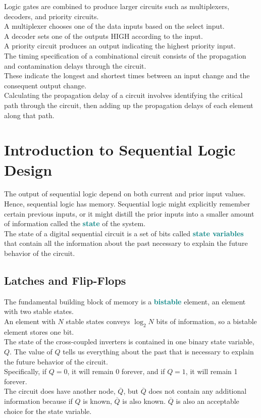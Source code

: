 \documentclass[12pt]{article}
\theoremstyle{definition}
\newcommand{\defnterm}[1]{\textbf{\textcolor{teal}{#1}}\index{#1}}
\begin{document}
  Logic gates are combined to produce larger circuits such as multiplexers, decoders, and priority circuits. \\
  A multiplexer chooses one of the data inputs based on the select input. \\
  A decoder sets one of the outputs HIGH according to the input. \\
  A priority circuit produces an output indicating the highest priority input. \\

  The timing specification of a combinational circuit consists of the propagation and contamination delays through the circuit. \\
  These indicate the longest and shortest times between an input change and the consequent output change. \\
  Calculating the propagation delay of a circuit involves identifying the critical path through the circuit, then adding up the propagation delays of each element along that path.

  \newpage
  \section{Introduction to Sequential Logic Design}
  The output of sequential logic depend on both current and prior input values. \\
  Hence, sequential logic has memory.
  Sequential logic might explicitly remember certain previous inputs, or it might distill the prior inputs into a smaller amount of information called the \defnterm{state} of the system. \\
  The state of a digital sequential circuit is a set of bits called \defnterm{state variables} that contain all the information about the past necessary to explain the future behavior of the circuit.

  \subsection{Latches and Flip-Flops}
  The fundamental building block of memory is a \defnterm{bistable} element, an element with two stable states. \\
  An element with $N$ stable states conveys $\log_{2}N$ bits of information, so a bistable element stores one bit. \\
  The state of the cross-coupled inverters is contained in one binary state variable, $Q$.
  The value of $Q$ tells us everything about the past that is necessary to explain the future behavior of the circuit. \\
  Specifically, if $Q = 0$, it will remain 0 forever, and if $Q = 1$, it will remain 1 forever. \\
  The circuit does have another node, $\overline{Q}$, but $\overline{Q}$ does not contain any additional information because if $Q$ is known, $\overline{Q}$ is also known.
  $\overline{Q}$ is also an acceptable choice for the state variable. \\
\end{document}

